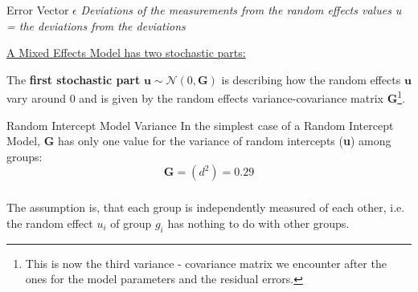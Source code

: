 \documentclass{beamer}
\begin{document}
\begin{frame}{Error Vector $\epsilon$}
\large \textit{Deviations of the measurements from the random effects values u = the deviations from the deviations}
\end{frame}

\begin{frame}{}
\Large
\underline{A Mixed Effects Model has two stochastic parts:}
\vspace{0.2cm}

The \textbf{first stochastic part} $\mathbf{u} \sim \mathcal{N}(0, \mathbf{G})$ is describing how the random effects $\mathbf{u}$ vary around $0$ and is given by the random effects variance-covariance matrix $\mathbf{G}$\footnote{This is now the third variance - covariance matrix we encounter after the ones for the model parameters and the residual errors.}.

\end{frame}



\begin{frame}{Random Intercept Model Variance}
\Large
In the simplest case of a Random Intercept Model, $\mathbf{G}$ has only one value for the variance of random intercepts (\textbf{u}) among groups:
\[
\mathbf{G} = \left( \mathit{d}^2 \right) = 0.29
\]
\end{frame}

\begin{frame}
\frametitle{}
\Large
The assumption is, that each group is independently measured of each other, i.e. the random effect $\mathit{u_i}$ of group $\mathit{g_i}$ has nothing to do with other groups.
\vspace{0.3cm}

\noindent{}
\end{frame}
\end{document}

